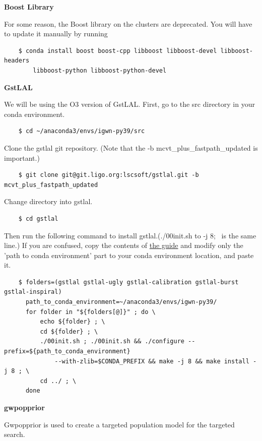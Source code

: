 \textbf{Boost Library}

For some reason, the Boost library on the clusters are deprecated. You will have to update it manually by running

\begin{verbatim}
    $ conda install boost boost-cpp libboost libboost-devel libboost-headers
        libboost-python libboost-python-devel
\end{verbatim}

\textbf{GstLAL}

We will be using the O3 version of GstLAL. First, go to the src directory in your conda environment.

\begin{verbatim}
    $ cd ~/anaconda3/envs/igwn-py39/src
\end{verbatim}

Clone the gstlal git repository. (Note that the -b mcvt\_plus\_fastpath\_updated is important.)

\begin{verbatim}
    $ git clone git@git.ligo.org:lscsoft/gstlal.git -b mcvt_plus_fastpath_updated
\end{verbatim}

Change directory into gstlal.

\begin{verbatim}
    $ cd gstlal
\end{verbatim}

Then run the following command to install gstlal.(./00init.sh to -j 8; \ is the same line.) If you are confused, copy the contents of \href{https://git.ligo.org/alvin.li/tesla/-/tree/o4a_version_1.0}{the guide} and modify only the 'path to conda environment' part to your conda environment location, and paste it.

\begin{verbatim}
    $ folders=(gstlal gstlal-ugly gstlal-calibration gstlal-burst gstlal-inspiral)
      path_to_conda_environment=~/anaconda3/envs/igwn-py39/
      for folder in "${folders[@]}" ; do \
	      echo ${folder} ; \
	      cd ${folder} ; \
	      ./00init.sh ; ./00init.sh && ./configure --prefix=${path_to_conda_environment}
              --with-zlib=$CONDA_PREFIX && make -j 8 && make install -j 8 ; \
	      cd ../ ; \
      done
\end{verbatim}

\textbf{gwpopprior}

Gwpopprior is used to create a targeted population model for the targeted search.

